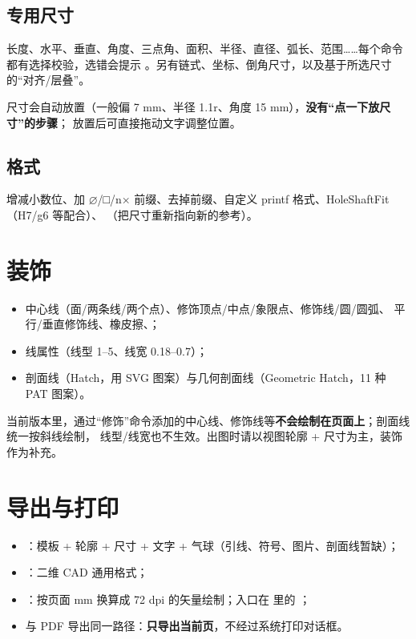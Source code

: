 \subsection{专用尺寸}

长度、水平、垂直、角度、三点角、面积、半径、直径、弧长、范围……每个命令都有选择校验，选错会提示
。另有链式、坐标、倒角尺寸，以及基于所选尺寸的“对齐/层叠”。

尺寸会自动放置（一般偏 7 mm、半径 1.1r、角度 15 mm），\textbf{没有“点一下放尺寸”的步骤}；
放置后可直接拖动文字调整位置。

\subsection{格式}

增减小数位、加 ⌀/□/n× 前缀、去掉前缀、自定义 printf 格式、HoleShaftFit（H7/g6 等配合）、
（把尺寸重新指向新的参考）。

\section{装饰}

\begin{itemize}
  \item 中心线（面/两条线/两个点）、修饰顶点/中点/象限点、修饰线/圆/圆弧、
        平行/垂直修饰线、橡皮擦、；
  \item 线属性（线型 1--5、线宽 0.18--0.7）；
  \item 剖面线（Hatch，用 SVG 图案）与几何剖面线（Geometric Hatch，11 种 PAT 图案）。
\end{itemize}

\begin{warn}[装饰几何在页面上的显示有限]
当前版本里，通过“修饰”命令添加的中心线、修饰线等\textbf{不会绘制在页面上}；剖面线统一按斜线绘制，
线型/线宽也不生效。出图时请以视图轮廓 + 尺寸为主，装饰作为补充。
\end{warn}

\section{导出与打印}

\begin{itemize}
  \item {}：模板 + 轮廓 + 尺寸 + 文字 + 气球（引线、符号、图片、剖面线暂缺）；
  \item {}：二维 CAD 通用格式；
  \item {}：按页面 mm 换算成 72 dpi 的矢量绘制；入口在  里的
        ；
  \item {} 与 PDF 导出同一路径：\textbf{只导出当前页}，不经过系统打印对话框。
\end{itemize}

